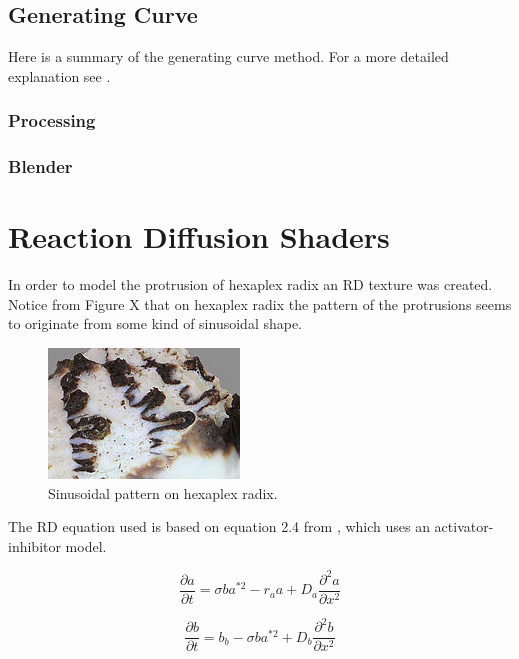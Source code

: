 \documentclass[a4paper]{article}
\begin{document}
\subsection{Generating Curve} 

Here is a summary of the generating curve method. For a more detailed explanation see \cite{JORGEPICADO}.

\subsubsection{Processing}

\subsubsection{Blender}

\section{Reaction Diffusion Shaders}

In order to model the protrusion of hexaplex radix an RD texture was created. Notice from Figure X that on hexaplex radix the pattern of the protrusions seems to originate from some kind of sinusoidal shape.

\begin{figure}[h]
	\centering\includegraphics[scale=1.0]{./img/hexaplex_radix_sine.jpg}
	\caption{Sinusoidal pattern on hexaplex radix.}
	\label{hexaplex-sine} %
\end{figure}

The RD equation used is based on equation 2.4 from \cite{abss}, which uses an activator-inhibitor model.

\begin{equation}
	\frac{\partial a}{\partial t} = \sigma b a^{*2} - r_a a + D_a \frac{\partial^2 a }{\partial x^2}
\end{equation}

\begin{equation}
	\frac{\partial b}{\partial t} = b_b - \sigma b a^{*2} + D_b \frac{\partial^2 b }{\partial x^2}
\end{equation}
\end{document}
